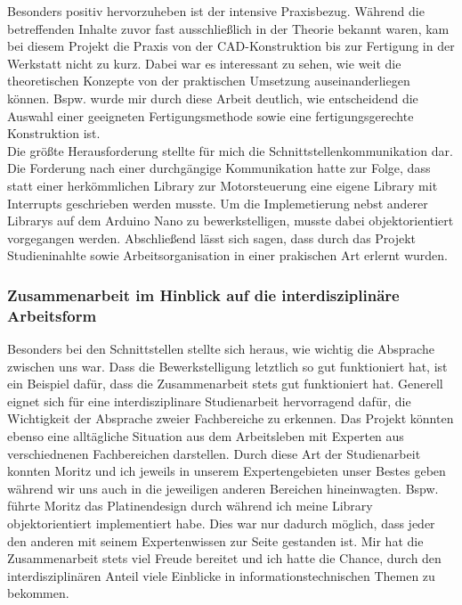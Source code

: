 Besonders positiv hervorzuheben ist der intensive Praxisbezug. Während die betreffenden Inhalte zuvor fast ausschließlich in der Theorie bekannt waren, kam bei diesem Projekt die Praxis von der CAD-Konstruktion bis zur Fertigung in der Werkstatt nicht zu kurz. Dabei war es interessant zu sehen, wie weit die theoretischen Konzepte von der praktischen Umsetzung auseinanderliegen können. Bspw. wurde mir durch diese Arbeit deutlich, wie entscheidend die Auswahl einer geeigneten Fertigungsmethode sowie eine fertigungsgerechte Konstruktion ist.  \\

Die größte Herausforderung stellte für mich die Schnittstellenkommunikation dar. Die Forderung nach einer durchgängige Kommunikation hatte zur Folge, dass statt einer herkömmlichen Library zur Motorsteuerung eine eigene Library mit Interrupts geschrieben werden musste. Um die Implemetierung nebst anderer Librarys auf dem Arduino Nano zu bewerkstelligen, musste dabei objektorientiert vorgegangen werden. Abschließend lässt sich sagen, dass durch das Projekt Studieninahlte sowie Arbeitsorganisation in einer prakischen Art erlernt wurden.

\subsubsection{Zusammenarbeit im Hinblick auf die interdisziplinäre Arbeitsform}
Besonders bei den Schnittstellen stellte sich heraus, wie wichtig die Absprache zwischen uns war. Dass die Bewerkstelligung letztlich so gut funktioniert hat, ist ein Beispiel dafür, dass die Zusammenarbeit stets gut funktioniert hat. Generell eignet sich für eine interdisziplinare Studienarbeit hervorragend dafür, die Wichtigkeit der Absprache zweier Fachbereiche zu erkennen. Das Projekt könnten ebenso eine alltägliche Situation aus dem Arbeitsleben mit Experten aus verschiednenen Fachbereichen darstellen. Durch diese Art der Studienarbeit konnten Moritz und ich jeweils in unserem Expertengebieten unser Bestes geben während wir uns auch in die jeweiligen anderen Bereichen hineinwagten. Bspw. führte Moritz das Platinendesign durch während ich meine Library objektorientiert implementiert habe. Dies war nur dadurch möglich, dass jeder den anderen mit seinem Expertenwissen zur Seite gestanden ist. Mir hat die Zusammenarbeit stets viel Freude bereitet und ich hatte die Chance, durch den interdisziplinären Anteil viele Einblicke in informationstechnischen Themen zu bekommen. 


